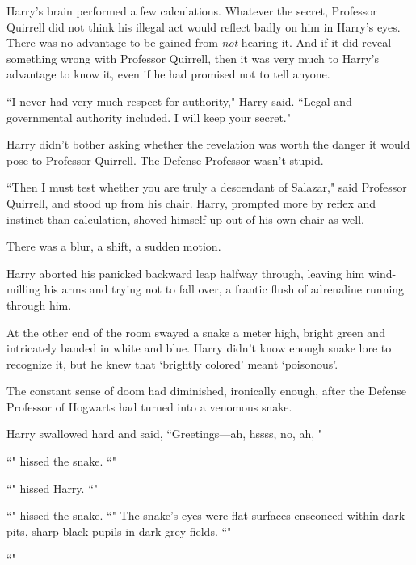 Harry's brain performed a few calculations. Whatever the secret, Professor Quirrell did not think his illegal act would reflect badly on him in Harry's eyes. There was no advantage to be gained from \emph{not} hearing it. And if it did reveal something wrong with Professor Quirrell, then it was very much to Harry's advantage to know it, even if he had promised not to tell anyone.

``I never had very much respect for authority," Harry said. ``Legal and governmental authority included. I will keep your secret."

Harry didn't bother asking whether the revelation was worth the danger it would pose to Professor Quirrell. The Defense Professor wasn't stupid.

``Then I must test whether you are truly a descendant of Salazar," said Professor Quirrell, and stood up from his chair. Harry, prompted more by reflex and instinct than calculation, shoved himself up out of his own chair as well.

There was a blur, a shift, a sudden motion.

Harry aborted his panicked backward leap halfway through, leaving him wind-milling his arms and trying not to fall over, a frantic flush of adrenaline running through him.

At the other end of the room swayed a snake a meter high, bright green and intricately banded in white and blue. Harry didn't know enough snake lore to recognize it, but he knew that `brightly colored' meant `poisonous'.

The constant sense of doom had diminished, ironically enough, after the Defense Professor of Hogwarts had turned into a venomous snake.

Harry swallowed hard and said, ``Greetings—ah, hssss, no, ah, "

``" hissed the snake. ``"

``" hissed Harry. ``"

``" hissed the snake. ``" The snake's eyes were flat surfaces ensconced within dark pits, sharp black pupils in dark grey fields. ``"

``"

